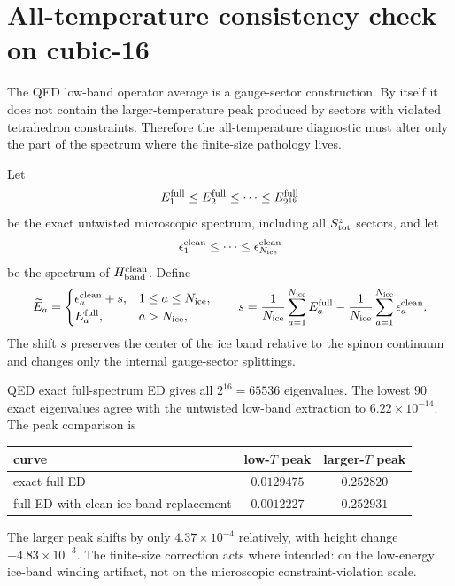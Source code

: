 \documentclass[11pt,letterpaper]{article}
\newcommand{\HB}{H_{\mathrm{band}}}
\theoremstyle{plain}
\theoremstyle{definition}
\begin{document}
\section{All-temperature consistency check on cubic-16}
\label{sec:all_temperature_check_new}

The QED low-band operator average is a gauge-sector construction.  By itself
it does not contain the larger-temperature peak produced by sectors with
violated tetrahedron constraints.  Therefore the all-temperature diagnostic
must alter only the part of the spectrum where the finite-size pathology lives.

Let
\[
E^{\rm full}_1\le E^{\rm full}_2\le \cdots \le E^{\rm full}_{2^{16}}
\]
be the exact untwisted microscopic spectrum, including all $S^z_{\rm tot}$
sectors, and let
\[
\epsilon^{\rm clean}_1\le\cdots\le \epsilon^{\rm clean}_{N_{\rm ice}}
\]
be the spectrum of $\HB^{\rm clean}$.  Define
\begin{equation}
\label{eq:allT_spectral_replacement_new}
\widetilde E_a =
\begin{cases}
\epsilon^{\rm clean}_a+s,&1\le a\le N_{\rm ice},\\
E^{\rm full}_a,&a>N_{\rm ice},
\end{cases}
\qquad
s =
\frac{1}{N_{\rm ice}}\sum_{a=1}^{N_{\rm ice}}E^{\rm full}_a
-
\frac{1}{N_{\rm ice}}\sum_{a=1}^{N_{\rm ice}}\epsilon^{\rm clean}_a .
\end{equation}
The shift $s$ preserves the center of the ice band relative to the spinon
continuum and changes only the internal gauge-sector splittings.

QED exact full-spectrum ED gives all $2^{16}=65536$ eigenvalues.  The lowest
$90$ exact eigenvalues agree with the untwisted low-band extraction to
$6.22\times10^{-14}$.  The peak comparison is
\begin{center}
\begin{tabular}{lcc}
\toprule
curve & low-$T$ peak & larger-$T$ peak\\
\midrule
exact full ED & $0.0129475$ & $0.252820$\\
full ED with clean ice-band replacement & $0.0012227$ & $0.252931$\\
\bottomrule
\end{tabular}
\end{center}
The larger peak shifts by only $4.37\times10^{-4}$ relatively, with height
change $-4.83\times10^{-3}$.  The finite-size correction acts where intended:
on the low-energy ice-band winding artifact, not on the microscopic
constraint-violation scale.
\end{document}
